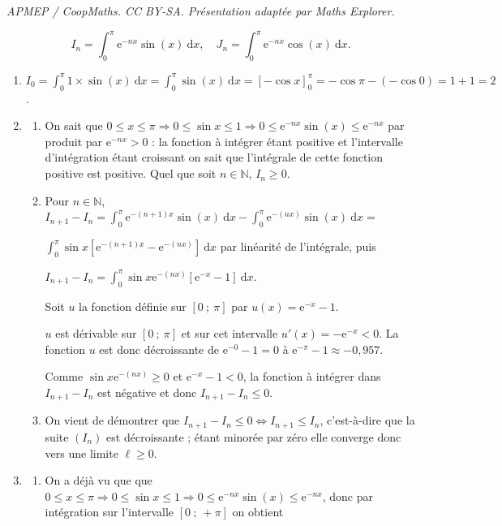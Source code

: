 \documentclass[10pt]{article}
\providecommand{\N}{\mathbb{N}}
\providecommand{\e}{{\mathrm{e}}}
\begin{document}
\noindent\textit{APMEP / CoopMaths. CC BY-SA. Présentation adaptée par Maths Explorer.}\par\medskip
\medskip



\[I_n = \displaystyle\int_0^{\pi} \text{e}^{- nx}\sin (x)\:\text{d}x, \quad  J_n = \displaystyle\int_0^{\pi} \text{e}^{-nx}\cos (x)\:\text{d}x.\]

\medskip

\begin{enumerate}
\item 
$I_0 = \displaystyle\int_0^{\pi} 1 \times \sin (x)\:\text{d}x = \displaystyle\int_0^{\pi} \sin (x)\:\text{d}x  = [- \cos x]_0^{\pi} = - \cos \pi - (- \cos 0) = 1 + 1 = 2$.
\item 
	\begin{enumerate}
		\item 
On sait que $0 \leqslant x \leqslant  \pi \Rightarrow 0 \leqslant \sin x \leqslant 1 \Rightarrow 0 \leqslant \text{e}^{- nx}\sin (x) \leqslant \text{e}^{- nx}$ par produit par $\text{e}^{- nx} > 0$ : la fonction à intégrer étant positive et l'intervalle d'intégration étant croissant on sait que l'intégrale de cette fonction positive est positive. Quel que soit $n \in \N$,\: $I_n \geqslant 0$.
		\item 
Pour $n \in \N$, \: $I_{n+1} - I_n  = \displaystyle\int_0^{\pi} \e^{-(n+1)x} \sin (x)\:\text{d}x - \displaystyle\int_0^{\pi} \e^{-(nx)} \sin (x)\:\text{d}x = $

$\displaystyle\int_0^{\pi}\sin x\left[\e^{-(n+1)x}  - \e^{-(nx)} \right]\:\text{d}x$ par linéarité de l'intégrale, puis 

$I_{n+1} - I_n  = \displaystyle\int_0^{\pi} \sin x  \e^{-(nx)}\left[\e^{- x} - 1\right]\:\text{d}x$.

Soit $u$ la fonction définie sur $[0~;~\pi]$ par $u(x) = \e^{- x} - 1$.

$u$ est dérivable sur $[0~;~\pi]$ et sur cet intervalle $u'(x) = - \e^{-x} < 0$.
La fonction $u$ est donc décroissante de $\e^{-0} - 1 = 0$ à $\e^{- \pi} - 1 \approx -0,957$.

Comme $\sin x  \e^{-(nx)} \geqslant 0$ et $\e^{- x} - 1 < 0$, la fonction à intégrer dans $I_{n+1} - I_n$ est négative et donc $I_{n+1} - I_n \leqslant 0$.
		\item 

On vient de démontrer que $I_{n+1} - I_n \leqslant 0 \iff I_{n+1} \leqslant I_n $, c'est-à-dire que la suite $\left(I_n\right)$ est décroissante ; étant minorée par zéro elle converge donc vers une limite $\ell \geqslant 0$.
	\end{enumerate}
\item
	\begin{enumerate}
		\item 
On a déjà vu que  que $0 \leqslant x \leqslant \pi \Rightarrow 0 \leqslant \sin x \leqslant 1 \Rightarrow 0 \leqslant \text{e}^{- nx}\sin (x) \leqslant \text{e}^{- nx}$, donc par intégration sur l'intervalle $[0~;~+ \pi]$ on obtient 
		

\end{enumerate}
\end{enumerate}
\end{document}
